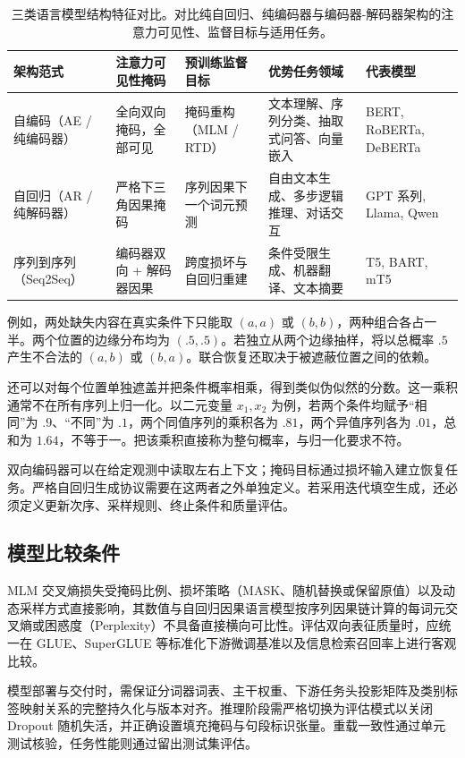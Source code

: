 \documentclass[../textbook.tex]{subfiles}
\begin{document}
\begin{table}[htbp]
\centering
\caption[三类语言模型结构特征对比]{三类语言模型结构特征对比。对比纯自回归、纯编码器与编码器-解码器架构的注意力可见性、监督目标与适用任务。}\label{tab:mlm-paradigms}
\begin{tabularx}{\linewidth}{lXXXX}
\toprule
架构范式 & 注意力可见性掩码 & 预训练监督目标 & 优势任务领域 & 代表模型\\\midrule
自编码（AE / 纯编码器） & 全向双向掩码，全部可见 & 掩码重构（MLM / RTD） & 文本理解、序列分类、抽取式问答、向量嵌入 & BERT, RoBERTa, DeBERTa\\
自回归（AR / 纯解码器） & 严格下三角因果掩码 & 序列因果下一个词元预测 & 自由文本生成、多步逻辑推理、对话交互 & GPT 系列, Llama, Qwen\\
序列到序列（Seq2Seq） & 编码器双向 + 解码器因果 & 跨度损坏与自回归重建 & 条件受限生成、机器翻译、文本摘要 & T5, BART, mT5\\
\bottomrule
\end{tabularx}
\end{table}

例如，两处缺失内容在真实条件下只能取 $(a,a)$ 或 $(b,b)$，两种组合各占一半。两个位置的边缘分布均为 $(.5,.5)$。若独立从两个边缘抽样，将以总概率 $.5$ 产生不合法的 $(a,b)$ 或 $(b,a)$。联合恢复还取决于被遮蔽位置之间的依赖。

\begin{example}[伪似然的归一化反例]
还可以对每个位置单独遮盖并把条件概率相乘，得到类似伪似然的分数。这一乘积通常不在所有序列上归一化。以二元变量 $x_1,x_2$ 为例，若两个条件均赋予“相同”为 $.9$、“不同”为 $.1$，两个同值序列的乘积各为 $.81$，两个异值序列各为 $.01$，总和为 $1.64$，不等于一。把该乘积直接称为整句概率，与归一化要求不符。
\end{example}

\begin{note}[目标与结构必须配合]
双向编码器可以在给定观测中读取左右上下文；掩码目标通过损坏输入建立恢复任务。严格自回归生成协议需要在这两者之外单独定义。若采用迭代填空生成，还必须定义更新次序、采样规则、终止条件和质量评估。
\end{note}

\subsection{模型比较条件}
MLM 交叉熵损失受掩码比例、损坏策略（MASK、随机替换或保留原值）以及动态采样方式直接影响，其数值与自回归因果语言模型按序列因果链计算的每词元交叉熵或困惑度（Perplexity）不具备直接横向可比性。评估双向表征质量时，应统一在 GLUE、SuperGLUE 等标准化下游微调基准以及信息检索召回率上进行客观比较。

模型部署与交付时，需保证分词器词表、主干权重、下游任务头投影矩阵及类别标签映射关系的完整持久化与版本对齐。推理阶段需严格切换为评估模式以关闭 Dropout 随机失活，并正确设置填充掩码与句段标识张量。重载一致性通过单元测试核验，任务性能则通过留出测试集评估。





\chapterreferences
\myendchapterdocument
\end{document}

